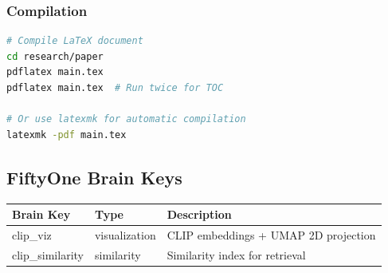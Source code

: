 \subsubsection{Compilation}

\begin{lstlisting}[language=bash]
# Compile LaTeX document
cd research/paper
pdflatex main.tex
pdflatex main.tex  # Run twice for TOC

# Or use latexmk for automatic compilation
latexmk -pdf main.tex
\end{lstlisting}

\subsection{FiftyOne Brain Keys}

\begin{table}[H]
\centering
\begin{tabular}{lll}
\toprule
\textbf{Brain Key} & \textbf{Type} & \textbf{Description} \\
\midrule
clip\_viz & visualization & CLIP embeddings + UMAP 2D projection \\
clip\_similarity & similarity & Similarity index for retrieval \\
\bottomrule
\end{tabular}
\end{table}
